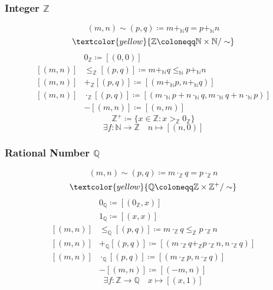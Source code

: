 \documentclass[UTF8,aspectratio=43,11pt,colorlinks,compress,openany]{beamer}%
\begin{document}
\begin{frame}\frametitle{Integer $\mathbb{Z}$}
	\[(m,n)\sim(p,q)\coloneqq m+_{\mathbb{N}}q=p+_{\mathbb{N}}n\]
	\[\textcolor{yellow}{\mathbb{Z}\coloneqq \mathbb{N}\times\mathbb{N}/\sim}\]
	\begin{align*}
	&0_{\mathbb{Z}}\coloneqq [(0,0)]\\
	[(m,n)]&\leq_{\mathbb{Z}}[(p,q)]\coloneqq m+_{\mathbb{N}}q\leq_{\mathbb{N}}p+_{\mathbb{N}}n\\
	[(m,n)]&+_{\mathbb{Z}}[(p,q)]\coloneqq [(m+_{\mathbb{N}}p,n+_{\mathbb{N}}q)]\\
	[(m,n)]&\cdot_{\mathbb{Z}}[(p,q)]\coloneqq [(m\cdot_{\mathbb{N}}p+n\cdot_{\mathbb{N}}q, m\cdot_{\mathbb{N}}q+n\cdot_{\mathbb{N}}p)]\\
	&-[(m,n)]\coloneqq [(n,m)]
	\end{align*}
	\[\mathbb{Z}^+\coloneqq \{x\in\mathbb{Z}: x>_{\mathbb{Z}}0_{\mathbb{Z}}\}\]
	\[\exists f:\mathbb{N}\to\mathbb{Z}\quad n\mapsto[(n,0)]\]
\end{frame}

\begin{frame}\frametitle{Rational Number $\mathbb{Q}$}
	\[(m,n)\sim(p,q)\coloneqq m\cdot_{\mathbb{Z}}q=p\cdot_{\mathbb{Z}}n\]
	\[\textcolor{yellow}{\mathbb{Q}\coloneqq \mathbb{Z}\times\mathbb{Z}^+/\sim}\]
	\begin{align*}
	&0_{\mathbb{Q}}\coloneqq [(0_{\mathbb{Z}},x)]\\
	&1_{\mathbb{Q}}\coloneqq [(x,x)]\\
	[(m,n)]&\leq_{\mathbb{Q}}[(p,q)]\coloneqq m\cdot_{\mathbb{Z}}q\leq_{\mathbb{Z}}p\cdot_{\mathbb{Z}}n\\
	[(m,n)]&+_{\mathbb{Q}}[(p,q)]\coloneqq [(m\cdot_{\mathbb{Z}}q+_{\mathbb{Z}}p\cdot_{\mathbb{Z}}n,n\cdot_{\mathbb{Z}}q)]\\
	[(m,n)]&\cdot_{\mathbb{Q}}[(p,q)]\coloneqq [(m\cdot_{\mathbb{Z}}p,n\cdot_{\mathbb{Z}}q)]\\
	&-[(m,n)]\coloneqq [(-m,n)]
	\end{align*}
	\[\exists f: \mathbb{Z}\to\mathbb{Q}\quad x\mapsto[(x,1)]\]
\end{frame}
\end{document}
